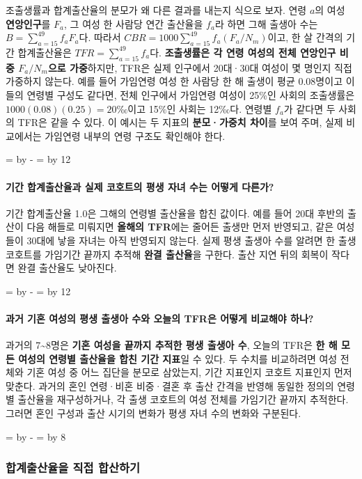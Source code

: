 \documentclass[10pt,a4paper]{article}
\newcommand{\ReserveQuestionSpace}{%
  \par\begingroup
  \dimen0=\pagegoal \advance\dimen0 by -\pagetotal
  \dimen2=\baselineskip \multiply\dimen2 by 12
  \ifdim\dimen0<\dimen2 \newpage\fi
  \endgroup}
\newcommand{\ReserveReadingSectionSpace}{%
  \par\begingroup
  \dimen0=\pagegoal \advance\dimen0 by -\pagetotal
  \dimen2=\baselineskip \multiply\dimen2 by 8
  \ifdim\dimen0<\dimen2 \newpage\fi
  \endgroup}
\begin{document}
조출생률과 합계출산율의 분모가 왜 다른 결과를 내는지 식으로 보자. 연령 $a$의 여성 \textbf{연앙인구}를 $F_a$, 그 여성 한 사람당 연간 출산율을 $f_a$라 하면 그해 출생아 수는 $B=\sum_{a=15}^{49} f_aF_a$다. 따라서 $CBR=1000\sum_{a=15}^{49} f_a(F_a/N_m)$이고, 한 살 간격의 기간 합계출산율은 $TFR=\sum_{a=15}^{49}f_a$다. \textbf{조출생률은 각 연령 여성의 전체 연앙인구 비중 $F_a/N_m$으로 가중}하지만, TFR은 실제 인구에서 20대·30대 여성이 몇 명인지 직접 가중하지 않는다. 예를 들어 가임연령 여성 한 사람당 한 해 출생이 평균 0.08명이고 이들의 연령별 구성도 같다면, 전체 인구에서 가임연령 여성이 25\%인 사회의 조출생률은 $1000(0.08)(0.25)=20$‰이고 15\%인 사회는 12‰다. 연령별 $f_a$가 같다면 두 사회의 TFR은 같을 수 있다. 이 예시는 두 지표의 \textbf{분모·가중치 차이}를 보여 주며, 실제 비교에서는 가임연령 내부의 연령 구조도 확인해야 한다.\par

\ReserveQuestionSpace
\paragraph{기간 합계출산율과 실제 코호트의 평생 자녀 수는 어떻게 다른가?}
기간 합계출산율 1.0은 그해의 연령별 출산율을 합친 값이다. 예를 들어 20대 후반의 출산이 다음 해들로 미뤄지면 \textbf{올해의 TFR}에는 줄어든 출생만 먼저 반영되고, 같은 여성들이 30대에 낳을 자녀는 아직 반영되지 않는다. 실제 평생 출생아 수를 알려면 한 출생 코호트를 가임기간 끝까지 추적해 \textbf{완결 출산율}을 구한다. 출산 지연 뒤의 회복이 작다면 완결 출산율도 낮아진다.\par

\ReserveQuestionSpace
\paragraph{과거 기혼 여성의 평생 출생아 수와 오늘의 TFR은 어떻게 비교해야 하나?}
과거의 7\textasciitilde{}8명은 \textbf{기혼 여성을 끝까지 추적한 평생 출생아 수}, 오늘의 TFR은 \textbf{한 해 모든 여성의 연령별 출산율을 합친 기간 지표}일 수 있다. 두 수치를 비교하려면 여성 전체와 기혼 여성 중 어느 집단을 분모로 삼았는지, 기간 지표인지 코호트 지표인지 먼저 맞춘다. 과거의 혼인 연령·비혼 비중·결혼 후 출산 간격을 반영해 동일한 정의의 연령별 출산율을 재구성하거나, 각 출생 코호트의 여성 전체를 가임기간 끝까지 추적한다. 그러면 혼인 구성과 출산 시기의 변화가 평생 자녀 수의 변화와 구분된다.\par

\ReserveReadingSectionSpace
\subsubsection*{합계출산율을 직접 합산하기}
\end{document}
